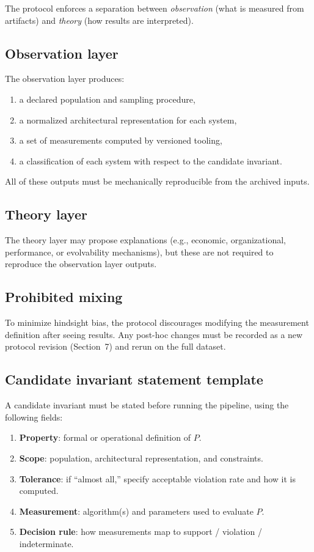 The protocol enforces a separation between \emph{observation} (what is measured from artifacts) and \emph{theory} (how results are interpreted).

\subsection*{Observation layer}
The observation layer produces:
\begin{enumerate}[leftmargin=*]
  \item a declared population and sampling procedure,
  \item a normalized architectural representation for each system,
  \item a set of measurements computed by versioned tooling,
  \item a classification of each system with respect to the candidate invariant.
\end{enumerate}
All of these outputs must be mechanically reproducible from the archived inputs.

\subsection*{Theory layer}
The theory layer may propose explanations (e.g., economic, organizational, performance, or evolvability mechanisms), but these are not required to reproduce the observation layer outputs.

\subsection*{Prohibited mixing}
To minimize hindsight bias, the protocol discourages modifying the measurement definition after seeing results. Any post-hoc changes must be recorded as a new protocol revision (Section~7) and rerun on the full dataset.

\subsection*{Candidate invariant statement template}
A candidate invariant must be stated before running the pipeline, using the following fields:
\begin{enumerate}[label=I\arabic*., leftmargin=*]
  \item \textbf{Property}: formal or operational definition of $P$.
  \item \textbf{Scope}: population, architectural representation, and constraints.
  \item \textbf{Tolerance}: if ``almost all,'' specify acceptable violation rate and how it is computed.
  \item \textbf{Measurement}: algorithm(s) and parameters used to evaluate $P$.
  \item \textbf{Decision rule}: how measurements map to support / violation / indeterminate.
\end{enumerate}